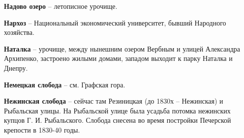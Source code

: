 \medskip










\textbf{Надово озеро} – летописное урочище.\\

\medskip

\textbf{Нархоз} – Национальный экономический университет, бывший Народного хозяйства.\\

\medskip

\textbf{Наталка} – урочище, между нынешним озером Вербным и улицей Александра Архипенко, застроено жилыми домами, западом выходит к парку Наталка и Днепру.\\
\medskip

\textbf{Немецкая слобода} – см. Графская гора.\\

\medskip


\textbf{Нежинская слобода} – сейчас там Резиницкая (до 1830х – Нежинская) и Рыбальская улицы. На Рыбальской улице была усадьба потомка нежинских купцов Г. И. Рыбальского. Слобода снесена во время постройки Печерской крепости в 1830-40 годы.\\ 

